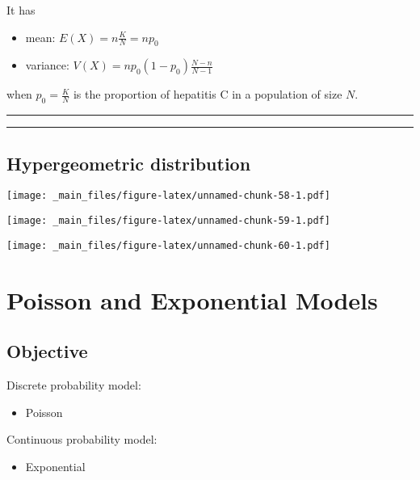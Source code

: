 \documentclass[
]{book}
\providecommand{\tightlist}{%
  \setlength{\itemsep}{0pt}\setlength{\parskip}{0pt}}
\begin{document}
It has

\begin{itemize}
\item
  mean: \(E (X) = n \frac{K}{N} = np_0\)
\item
  variance: \(V(X) = np_0(1-p_0)\frac{N-n}{N-1}\)
\end{itemize}

when \(p_0=\frac{K}{N}\) is the proportion of hepatitis C in a population of size \(N\).

\begin{center}\rule{0.5\linewidth}{0.5pt}\end{center}

\begin{center}\rule{0.5\linewidth}{0.5pt}\end{center}

\hypertarget{hypergeometric-distribution-2}{%
\section{Hypergeometric distribution}\label{hypergeometric-distribution-2}}

\texttt{[image: \_main\_files/figure-latex/unnamed-chunk-58-1.pdf]}

\texttt{[image: \_main\_files/figure-latex/unnamed-chunk-59-1.pdf]}

\texttt{[image: \_main\_files/figure-latex/unnamed-chunk-60-1.pdf]}

\hypertarget{poisson-and-exponential-models}{%
\chapter{Poisson and Exponential Models}\label{poisson-and-exponential-models}}

\hypertarget{objective-6}{%
\section{Objective}\label{objective-6}}

Discrete probability model:

\begin{itemize}
\tightlist
\item
  Poisson
\end{itemize}

Continuous probability model:

\begin{itemize}
\tightlist
\item
  Exponential
\end{itemize}
\end{document}
